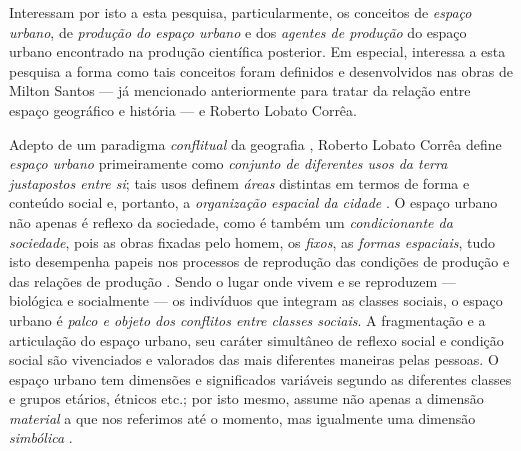 Interessam por isto a esta pesquisa, particularmente, os conceitos de \textit{espaço urbano}, de \textit{produção do espaço urbano} e dos \textit{agentes de produção} do espaço urbano encontrado na produção científica posterior. Em especial, interessa a esta pesquisa a forma como tais conceitos foram definidos e desenvolvidos nas obras de Milton Santos --- já mencionado anteriormente para tratar da relação entre espaço geográfico e história --- e Roberto Lobato Corrêa.

Adepto de um paradigma \textit{conflitual} da geografia \cite[p.~6]{CORREA1985espa}, Roberto Lobato Corrêa define \textit{espaço urbano} primeiramente como \textit{conjunto de diferentes usos da terra justapostos entre si}; tais usos definem \textit{áreas} distintas em termos de forma e conteúdo social e, portanto, a \textit{organização espacial da cidade} \cite[p.~7]{CORREA1985espa}. O espaço urbano não apenas é reflexo da sociedade, como é também um \textit{condicionante da sociedade}, pois as obras fixadas pelo homem, os \textit{fixos}, as \textit{formas espaciais}, tudo isto desempenha papeis nos processos de reprodução das condições de produção e das relações de produção \cite[p.~8]{CORREA1985espa}. Sendo o lugar onde vivem e se reproduzem --- biológica e socialmente --- os indivíduos que integram as classes sociais, o espaço urbano é \textit{palco e objeto dos conflitos entre classes sociais}. A fragmentação e a articulação do espaço urbano, seu caráter simultâneo de reflexo social e condição social são vivenciados e valorados das mais diferentes maneiras pelas pessoas. O espaço urbano tem dimensões e significados variáveis segundo as diferentes classes e grupos etários, étnicos etc.; por isto mesmo, assume não apenas a dimensão \textit{material} a que nos referimos até o momento, mas igualmente uma dimensão \textit{simbólica} \cite[p.~150-151]{CORREA1997}.

